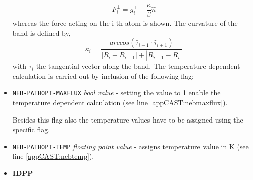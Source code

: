 \documentclass[a4paper,11pt]{scrartcl}
\begin{document}
\begin{itemize}
	\begin{equation}
	 F^{\bot}_{i}=g^{\bot}_{i} - \frac{\kappa}{\beta} \hat{n}
	\end{equation}
	whereas the force acting on the i-th atom is shown. The curvature of the band is defined by,	
	\begin{equation}
	\kappa_{i}=\frac{arccos(\hat{\tau}_{i-1}\cdot\hat{\tau}_{i+1})}{\left|R_{i}-R_{i-1}\right|+\left|R_{i+1}-R_{i}\right|}
	\end{equation}
	with $\tau_{i}$ the tangential vector along the band. The temperature dependent calculation is carried out by inclusion of the following flag:
	
\item \texttt{NEB-PATHOPT-MAXFLUX}  \textit{bool value} - setting the value to 1 enable the temperature dependent calculation (see line \ref{appCAST:nebmaxflux}). \newline

Besides this flag also the temperature values have to be assigned using the specific flag. \newline

\item \texttt{NEB-PATHOPT-TEMP} \textit{floating point value} - assigns temperature value in K (see line \ref{appCAST:nebtemp}).




\item \textbf{IDPP} 


\end{itemize}
\end{document}
